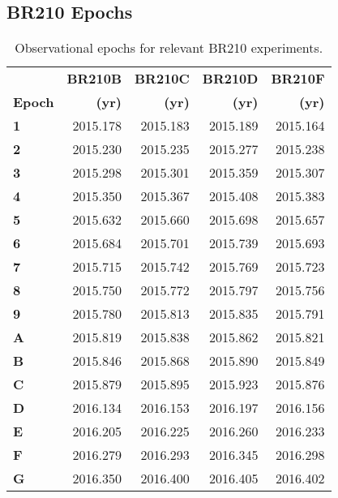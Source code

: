 	 \subsection{BR210 Epochs}
        \begin{table}[h]
        	\onehalfspacing
        	\footnotesize
        	\centering
        	\caption[BR210 Epochs]{Observational epochs for relevant BR210 experiments.}
        	\label{tab:br210_epochs}
        	\begin{tabular}{lrrrr}
        		\toprule
        		&\textbf{BR210B}&\textbf{BR210C}&\textbf{BR210D}&\textbf{BR210F}\\
        		\textbf{Epoch}&\textbf{(yr)}  &\textbf{(yr)}  &\textbf{(yr)}  &\textbf{(yr)}  \\\midrule
        		\textbf{1}    &2015.178       &2015.183       &2015.189       &2015.164       \\
        		\textbf{2}    &2015.230       &2015.235       &2015.277       &2015.238       \\
        		\textbf{3}    &2015.298       &2015.301       &2015.359       &2015.307       \\
        		\textbf{4}    &2015.350       &2015.367       &2015.408       &2015.383       \\
        		\textbf{5}    &2015.632       &2015.660       &2015.698       &2015.657       \\
        		\textbf{6}    &2015.684       &2015.701       &2015.739       &2015.693       \\
        		\textbf{7}    &2015.715       &2015.742       &2015.769       &2015.723       \\
        		\textbf{8}    &2015.750       &2015.772       &2015.797       &2015.756       \\
        		\textbf{9}    &2015.780       &2015.813       &2015.835       &2015.791       \\
        		\textbf{A}    &2015.819       &2015.838       &2015.862       &2015.821       \\
        		\textbf{B}    &2015.846       &2015.868       &2015.890       &2015.849       \\
        		\textbf{C}    &2015.879       &2015.895       &2015.923       &2015.876       \\
        		\textbf{D}    &2016.134       &2016.153       &2016.197       &2016.156       \\
        		\textbf{E}    &2016.205       &2016.225       &2016.260       &2016.233       \\
        		\textbf{F}    &2016.279       &2016.293       &2016.345       &2016.298       \\
        		\textbf{G}    &2016.350       &2016.400       &2016.405       &2016.402       \\
        		\bottomrule
        	\end{tabular}
        \end{table} 


